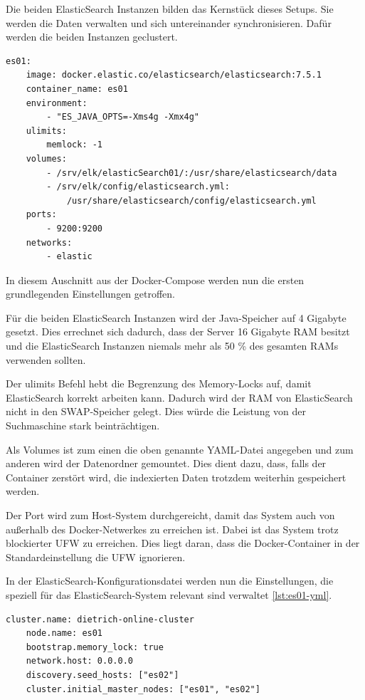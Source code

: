 Die beiden ElasticSearch Instanzen bilden das Kernstück dieses Setups. Sie werden die Daten verwalten und sich untereinander synchronisieren. Dafür werden die beiden Instanzen geclustert.

\begin{lstlisting}[language=XML, frame=single, label={lst:es01}] 
	es01:
	image: docker.elastic.co/elasticsearch/elasticsearch:7.5.1
	container_name: es01
	environment:
		- "ES_JAVA_OPTS=-Xms4g -Xmx4g"
	ulimits:
		memlock: -1
	volumes:
		- /srv/elk/elasticSearch01/:/usr/share/elasticsearch/data
		- /srv/elk/config/elasticsearch.yml:
			/usr/share/elasticsearch/config/elasticsearch.yml
	ports:
		- 9200:9200
	networks:
		- elastic
\end{lstlisting}

In diesem Auschnitt aus der Docker-Compose werden nun die ersten grundlegenden Einstellungen getroffen.

Für die beiden ElasticSearch Instanzen wird der Java-Speicher auf 4 Gigabyte gesetzt. Dies errechnet sich dadurch, dass der Server 16 Gigabyte RAM besitzt und die ElasticSearch Instanzen niemals mehr als 50 \% des gesamten RAMs verwenden sollten. \cite{ElasticsearchB.V..12172019}

Der ulimits Befehl hebt die Begrenzung des Memory-Locks auf, damit ElasticSearch korrekt arbeiten kann. Dadurch wird der RAM von ElasticSearch nicht in den SWAP-Speicher gelegt. Dies würde die Leistung von der Suchmaschine stark beinträchtigen.

Als Volumes ist zum einen die oben genannte YAML-Datei angegeben und zum anderen wird der Datenordner gemountet. Dies dient dazu, dass, falls der Container zerstört wird, die indexierten Daten trotzdem weiterhin gespeichert werden.

Der Port wird zum Host-System durchgereicht, damit das System auch von außerhalb des Docker-Netwerkes zu erreichen ist. Dabei ist das System trotz blockierter UFW zu erreichen. Dies liegt daran, dass die Docker-Container in der Standardeinstellung die UFW ignorieren.

In der ElasticSearch-Konfigurationsdatei werden nun die Einstellungen, die speziell für das ElasticSearch-System relevant sind verwaltet \ref{lst:es01-yml}. 

\begin{lstlisting}[language=XML, frame=single, label={lst:es01-yml}] 
	cluster.name: dietrich-online-cluster
	node.name: es01
	bootstrap.memory_lock: true
	network.host: 0.0.0.0
	discovery.seed_hosts: ["es02"]
	cluster.initial_master_nodes: ["es01", "es02"]
\end{lstlisting}

